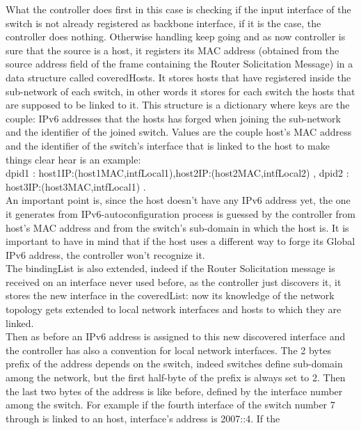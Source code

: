 \documentclass{article}
\begin{document}
What the controller does first in this case is checking if the input
interface of the switch is not already registered as backbone
interface, if it is the case, the controller does nothing. Otherwise
handling keep going and as now controller is sure that the source is a
host, it registers its MAC address (obtained from the source address
field of the frame containing the Router Solicitation Message) in a
data structure called coveredHosts. It stores hosts that have
registered inside the sub-network of each switch, in other words it
stores for each switch the hosts that are supposed to be linked to
it. This structure is a dictionary where keys are the couple: IPv6
addresses that the hosts has forged when joining the sub-network and
the identifier of the joined switch. Values are the couple host's
MAC address and the identifier of the switch's interface that is
linked to the host to make things clear hear is an example:\\ {dpid1
  : {host1IP:(host1MAC,intfLocal1),host2IP:(host2MAC,intfLocal2)} ,
  dpid2 : {host3IP:(host3MAC,intfLocal1)} }. \\
\newline
An important point is, since the host doesn't have any IPv6 address
yet, the one it generates from IPv6-autoconfiguration process is
guessed by the controller from host's MAC address and from the switch's
sub-domain in which the host is. It is important to have in mind that
if the host uses a different way to forge its Global IPv6 address, the
controller won't recognize it.\\
\newline
The bindingList is also extended, indeed if the Router Solicitation
message is received on an interface never used before, as the
controller just discovers it, it stores the new interface in the
coveredList: now its knowledge of the network topology gets extended
to local network interfaces and hosts to which they are linked.\\
\newline
Then as before an IPv6 address is assigned to this new discovered
interface and the controller has also a convention for local network
interfaces. The 2 bytes prefix of the address depends on the switch,
indeed switches define sub-domain among the network, but the first
half-byte of the prefix is always set to 2. Then the last two bytes of
the address is like before, defined by the interface number among the
switch. For example if the fourth interface of the switch number 7
through is linked to an host, interface's address is 2007::4.  If the
\end{document}
